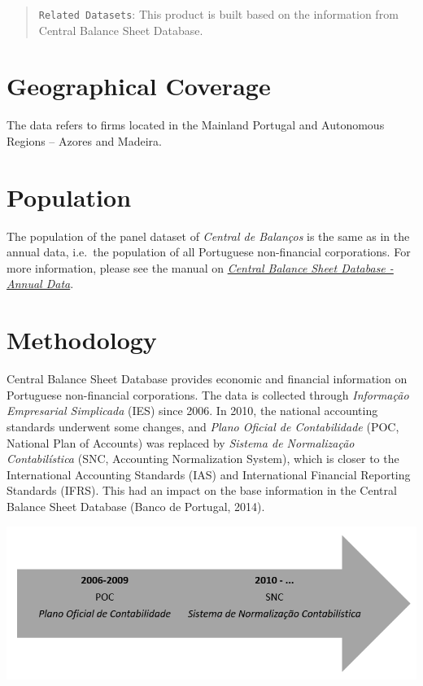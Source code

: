 \documentclass[]{book}
\begin{document}
\begin{quote}
\texttt{Related\ Datasets}: This product is built based on the information from Central Balance Sheet Database.
\end{quote}

\hypertarget{geographical-coverage}{%
\chapter{Geographical Coverage}\label{geographical-coverage}}

The data refers to firms located in the Mainland Portugal and Autonomous Regions -- Azores and Madeira.

\hypertarget{population}{%
\chapter{Population}\label{population}}

The population of the panel dataset of \emph{Central de Balanços} is the same as in the annual data, i.e.~the population of all Portuguese non-financial corporations. For more information, please see the manual on \href{../../CB/Jun2018/Pack_CB_Empresas_Jun18/manual_CB_Jun2018.html}{\emph{Central Balance Sheet Database - Annual Data}}.

\hypertarget{methodology}{%
\chapter{Methodology}\label{methodology}}

Central Balance Sheet Database provides economic and financial information on Portuguese non-financial corporations. The data is collected through \emph{Informação Empresarial Simplicada} (IES) since 2006. In 2010, the national accounting standards underwent some changes, and \emph{Plano Oficial de Contabilidade} (POC, National Plan of Accounts) was replaced by \emph{Sistema de Normalização Contabilística} (SNC, Accounting Normalization System), which is closer to the International Accounting Standards (IAS) and International Financial Reporting Standards (IFRS). This had an impact on the base information in the Central Balance Sheet Database (Banco de Portugal, 2014).

\includegraphics{./media/accounting_years.png}
\end{document}
